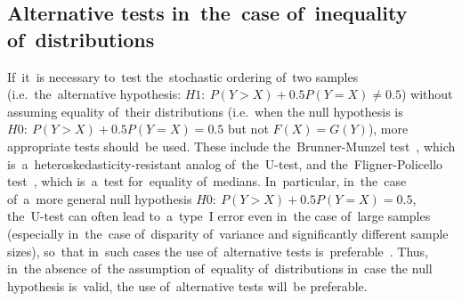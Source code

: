 \documentclass[russian,english]{scrreprt}
\begin{document}
\subsection{Alternative tests in~the~case of~inequality of~distributions}
If~it~is necessary to~test the~stochastic ordering of~two samples (i.e.~the~alternative hypothesis: $H1:\ P(Y>X)+0.5P(Y=X)\neq0.5$) without assuming equality of~their distributions (i.e.~when the null hypothesis is~$H0:\ P(Y>X)+0.5P(Y=X)=0.5$ but not $F(X)=G(Y)$), more appropriate tests should~be used. These include the~Brunner-Munzel test~\cite{Bruner-Munzel-test-1}, which is~a~heteroskedasticity-resistant analog of~the~U-test, and the~Fligner-Policello test~\cite{Fligner-Policello-test}, which is~a~test for~equality of~medians. In~particular, in~the~case of~a~more general null hypothesis $H0:\ P(Y>X)+0.5P(Y=X)=0.5$, the~U-test can often lead to~a~type~I error even in~the case of~large samples (especially in~the~case of~disparity of~variance and significantly different sample sizes), so~that in~such cases the use of~alternative tests is~preferable~\cite{U-test-vs-Bruner-Munzel-test}. Thus, in~the absence of~the assumption of~equality of~distributions in~case the null hypothesis is~valid, the use of~alternative tests will~be preferable.
%
\clearpage 

\nocite{Essential-Statistical-Inference}
\nocite{AUC-optimization}
\nocite{Mann-Whitney-1947}
\nocite{Optimizing-classifier-performance}
\nocite{ROC-R-1}
\nocite{ROC-AUC-1}
\nocite{ROC-AUC-meets-U-R-1}

\printbibliography
\end{document}

